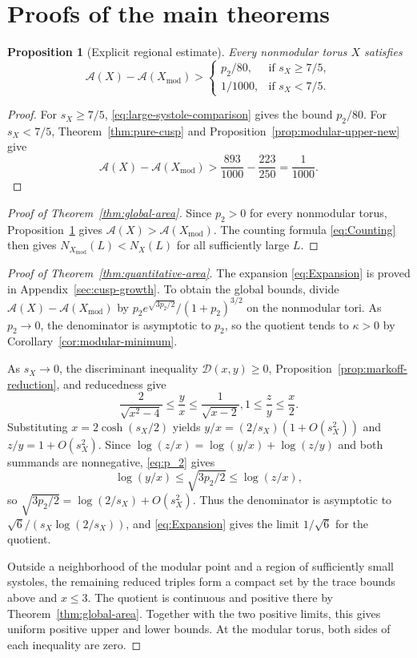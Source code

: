 \documentclass[10pt,twoside]{article}
\theoremstyle{plain}
\newtheorem{proposition}[theorem]{Proposition}
\theoremstyle{definition}
\theoremstyle{remark}
\newcommand{\A}{\mathcal A}
\newcommand{\Xmod}{X_{\mathrm{mod}}}
\begin{document}
\section{Proofs of the main theorems}
\label{sec:completion}

\begin{proposition}[Explicit regional estimate]
\label{prop:regional-area}
Every nonmodular torus $X$ satisfies
$$
\A(X)-\A(\Xmod)>
\begin{cases}
p_2/80,&\text{if }s_X\geq7/5,\\
1/1000,&\text{if }s_X<7/5.
\end{cases}
$$
\end{proposition}

\begin{proof}
For $s_X\geq7/5$, \eqref{eq:large-systole-comparison} gives the bound
$p_2/80$.
For $s_X<7/5$, Theorem~\ref{thm:pure-cusp} and
Proposition~\ref{prop:modular-upper-new} give
$$
\A(X)-\A(\Xmod)>\frac{893}{1000}-\frac{223}{250}=\frac1{1000}.
$$
\end{proof}

\begin{proof}[Proof of Theorem~\ref{thm:global-area}]
Since $p_2>0$ for every nonmodular torus,
Proposition~\ref{prop:regional-area} gives $\A(X)>\A(\Xmod)$.
The counting formula \eqref{eq:Counting} then gives
$N_{\Xmod}(L)<N_X(L)$ for all sufficiently large $L$.
\end{proof}

\begin{proof}[Proof of Theorem~\ref{thm:quantitative-area}]
The expansion \eqref{eq:Expansion} is proved in
Appendix~\ref{sec:cusp-growth}. To obtain the global bounds,
divide $\A(X)-\A(\Xmod)$ by
$p_2e^{\sqrt{3p_2/2}}/(1+p_2)^{3/2}$ on the nonmodular tori.
As $p_2\to0$, the denominator is asymptotic to $p_2$, so the quotient
tends to $\kappa>0$ by Corollary~\ref{cor:modular-minimum}.

As $s_X\to0$, the discriminant inequality $\mathscr D(x,y)\geq0$,
Proposition~\ref{prop:markoff-reduction}, and reducedness give
$$
\frac{2}{\sqrt{x^2-4}}\leq\frac yx\leq\frac1{\sqrt{x-2}},
1\leq\frac zy\leq\frac x2.
$$
Substituting $x=2\cosh(s_X/2)$ yields
$y/x=(2/s_X)(1+O(s_X^2))$ and $z/y=1+O(s_X^2)$.
Since $\log(z/x)=\log(y/x)+\log(z/y)$ and both summands are nonnegative,
\eqref{eq:p_2} gives
$$
\log(y/x)\leq\sqrt{3p_2/2}\leq\log(z/x),
$$
so $\sqrt{3p_2/2}=\log(2/s_X)+O(s_X^2)$.
Thus the denominator is asymptotic to
$\sqrt{6}/(s_X\log(2/s_X))$, and \eqref{eq:Expansion} gives
the limit $1/\sqrt{6}$ for the quotient.

Outside a neighborhood of the modular point and a region of sufficiently
small systoles, the remaining reduced triples form a compact set by the trace
bounds above and $x\leq3$. The quotient is continuous and positive
there by Theorem~\ref{thm:global-area}. Together with the two positive
limits, this gives uniform positive upper and lower bounds.
At the modular torus, both sides of each inequality are zero.
\end{proof}
\end{document}
